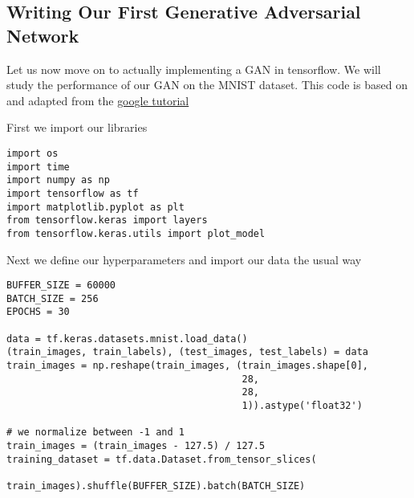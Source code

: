 \documentclass[%
oneside,                 %
final,                   %
10pt]{article}
\begin{document}
\subsection*{Writing Our First Generative Adversarial Network}
Let us now move on to actually implementing a GAN in tensorflow. We will study
the performance of our GAN on the MNIST dataset. This code is based on and
adapted from the
\href{{https://www.tensorflow.org/tutorials/generative/dcgan}}{google tutorial}

First we import our libraries









\begin{verbatim}
import os
import time
import numpy as np
import tensorflow as tf
import matplotlib.pyplot as plt
from tensorflow.keras import layers
from tensorflow.keras.utils import plot_model

\end{verbatim}


Next we define our hyperparameters and import our data the usual way

















\begin{verbatim}
BUFFER_SIZE = 60000
BATCH_SIZE = 256
EPOCHS = 30

data = tf.keras.datasets.mnist.load_data()
(train_images, train_labels), (test_images, test_labels) = data
train_images = np.reshape(train_images, (train_images.shape[0],
                                         28,
                                         28,
                                         1)).astype('float32')

# we normalize between -1 and 1
train_images = (train_images - 127.5) / 127.5
training_dataset = tf.data.Dataset.from_tensor_slices(
                      train_images).shuffle(BUFFER_SIZE).batch(BATCH_SIZE)

\end{verbatim}
\end{document}

